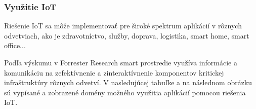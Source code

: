 \documentclass[../../main.tex]{subfiles}
\begin{document}
\newpage
\subsubsection{Využitie IoT}
    Riešenie IoT sa môže implementovať pre široké spektrum aplikácií v rôznych odvetviach, ako je zdravotníctvo, služby, doprava, logistika, smart home, smart office...
    
    Podľa výskumu v Forrester Research \cite{Forrester} smart prostredie využíva informácie a komunikáciu na zefektívnenie a zinteraktívnenie komponentov kritickej infraštruktúry rôznych odvetví. V nasledujúcej tabuľke a na následnom obrázku sú vypísané a zobrazené domény možného využitia aplikácií pomocou riešenia  IoT.

\end{document}
